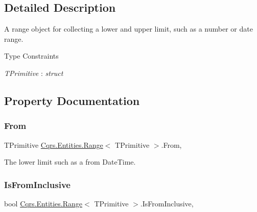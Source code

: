 \subsection{Detailed Description}
A range object for collecting a lower and upper limit, such as a number or date range. 

\begin{Desc}
\item[Type Constraints]\begin{description}
\item[{\em T\+Primitive} : {\em struct}]\end{description}
\end{Desc}


\subsection{Property Documentation}
\mbox{\label{classCqrs_1_1Entities_1_1Range_a373db08544a25cb6d53411f56e0e072a}} 
\subsubsection{\texorpdfstring{From}{From}}
{\footnotesize\ttfamily T\+Primitive \hyperlink{classCqrs_1_1Entities_1_1Range}{Cqrs.\+Entities.\+Range}$<$ T\+Primitive $>$.From\hspace{0.3cm}{\ttfamily [get]}, {\ttfamily [set]}}



The lower limit such as a from Date\+Time. 

\mbox{\label{classCqrs_1_1Entities_1_1Range_a135f90a2f05344538e79a40b5da28378}} 
\subsubsection{\texorpdfstring{Is\+From\+Inclusive}{IsFromInclusive}}
{\footnotesize\ttfamily bool \hyperlink{classCqrs_1_1Entities_1_1Range}{Cqrs.\+Entities.\+Range}$<$ T\+Primitive $>$.Is\+From\+Inclusive\hspace{0.3cm}{\ttfamily [get]}, {\ttfamily [set]}}



